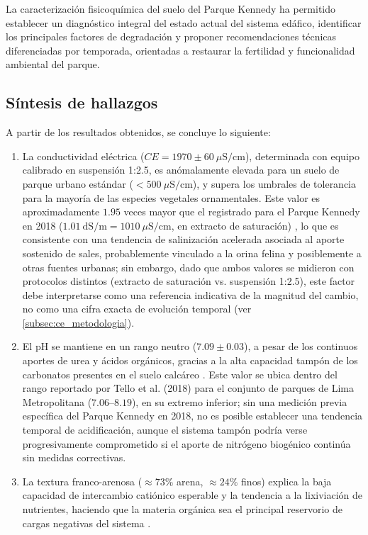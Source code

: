 \documentclass[fleqn]{jaes}
\begin{document}
La caracterización fisicoquímica del suelo del Parque Kennedy ha permitido establecer un diagnóstico integral del estado actual del sistema edáfico, identificar los principales factores de degradación y proponer recomendaciones técnicas diferenciadas por temporada, orientadas a restaurar la fertilidad y funcionalidad ambiental del parque.

\subsection{Síntesis de hallazgos}

A partir de los resultados obtenidos, se concluye lo siguiente:

\begin{enumerate}
  \item La conductividad eléctrica ($CE = 1970 \pm 60~\mu\text{S/cm}$), determinada con equipo calibrado en suspensión 1:2.5, es anómalamente elevada para un suelo de parque urbano estándar ($< 500~\mu\text{S/cm}$), y supera los umbrales de tolerancia para la mayoría de las especies vegetales ornamentales. Este valor es aproximadamente $1.95$ veces mayor que el registrado para el Parque Kennedy en 2018 ($1.01~\text{dS/m} = 1010~\mu\text{S/cm}$, en extracto de saturación) \cite{Tello2018}, lo que es consistente con una tendencia de salinización acelerada asociada al aporte sostenido de sales, probablemente vinculado a la orina felina y posiblemente a otras fuentes urbanas; sin embargo, dado que ambos valores se midieron con protocolos distintos (extracto de saturación vs. suspensión 1:2.5), este factor debe interpretarse como una referencia indicativa de la magnitud del cambio, no como una cifra exacta de evolución temporal (ver \cref{subsec:ce_metodologia}).

  \item El pH se mantiene en un rango neutro ($7.09 \pm 0.03$), a pesar de los continuos aportes de urea y ácidos orgánicos, gracias a la alta capacidad tampón de los carbonatos presentes en el suelo calcáreo \cite{Taalab2019}. Este valor se ubica dentro del rango reportado por Tello et al. (2018) para el conjunto de parques de Lima Metropolitana ($7.06$--$8.19$), en su extremo inferior; sin una medición previa específica del Parque Kennedy en 2018, no es posible establecer una tendencia temporal de acidificación, aunque el sistema tampón podría verse progresivamente comprometido si el aporte de nitrógeno biogénico continúa sin medidas correctivas.

  \item La textura franco-arenosa ($\approx 73\%$ arena, $\approx 24\%$ finos) explica la baja capacidad de intercambio catiónico esperable y la tendencia a la lixiviación de nutrientes, haciendo que la materia orgánica sea el principal reservorio de cargas negativas del sistema \cite{Bilen2025}.


\end{enumerate}
\end{document}
